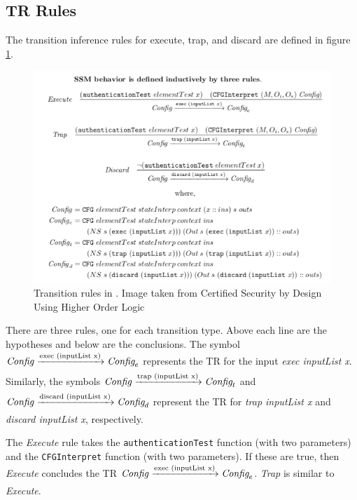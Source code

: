\documentclass[../../main/main.tex]{subfiles}
\begin{document}
\subsection{TR Rules}\label{ssec:trrules}
The transition inference rules for execute, trap, and discard are defined in figure \ref{trrules}.

\begin{figure}[h!]
\centering
\includegraphics[width=\textwidth]{../figures/trrules}
\caption{\label{trrules} Transition rules in .   Image taken from Certified Security by Design Using Higher Order Logic \cite{certmanual}}
\end{figure}

There are three rules, one for each transition type.  Above each line are the hypotheses and below are the conclusions.  The symbol $\text{\textit{Config}}  \xrightarrow[\text{}]{\text{exec (inputList x)}} \textit{Config}_e$ represents the TR for the input \textit{exec inputList x}.  Similarly, the symbols $\text{\textit{Config}}  \xrightarrow[\text{}]{\text{trap (inputList x)}} \textit{Config}_t$ and $\text{\textit{Config}}  \xrightarrow[\text{}]{\text{discard (inputList x)}} \textit{Config}_d$ represent the TR for \textit{trap inputList x} and \textit{discard inputList x}, respectively. 


The \textit{Execute} rule takes the \texttt{authenticationTest} function (with two parameters) and the \texttt{CFGInterpret} function (with two parameters).  If these are true, then \textit{Execute} concludes the TR  $\text{\textit{Config}}  \xrightarrow[\text{}]{\text{exec (inputList x)}} \textit{Config}_e$.  \textit{Trap} is similar to \textit{Execute}.
\end{document}
